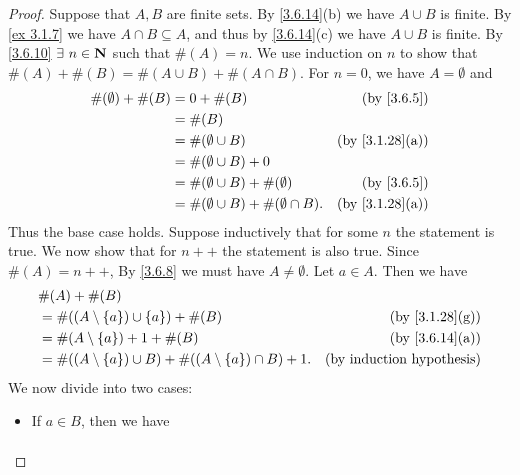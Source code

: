\begin{proof}
  Suppose that \(A, B\) are finite sets.
  By \cref{3.6.14}(b) we have \(A \cup B\) is finite.
  By \cref{ex 3.1.7} we have \(A \cap B \subseteq A\), and thus by \cref{3.6.14}(c) we have \(A \cup B\) is finite.
  By \cref{3.6.10} \(\exists\ n \in \N\) such that \(\#(A) = n\).
  We use induction on \(n\) to show that \(\#(A) + \#(B) = \#(A \cup B) + \#(A \cap B)\).
  For \(n = 0\), we have \(A = \emptyset\) and
  \begin{align*}
    \#(\emptyset) + \#(B) & = 0 + \#(B)                                    & \text{(by \cref{3.6.5})}     \\
                          & = \#(B)                                                                       \\
                          & = \#(\emptyset \cup B)                         & \text{(by \cref{3.1.28}(a))} \\
                          & = \#(\emptyset \cup B) + 0                                                    \\
                          & = \#(\emptyset \cup B) + \#(\emptyset)         & \text{(by \cref{3.6.5})}     \\
                          & = \#(\emptyset \cup B) + \#(\emptyset \cap B). & \text{(by \cref{3.1.28}(a))}
  \end{align*}
  Thus the base case holds.
  Suppose inductively that for some \(n\) the statement is true.
  We now show that for \(n++\) the statement is also true.
  Since \(\#(A) = n++\), By \cref{3.6.8} we must have \(A \neq \emptyset\).
  Let \(a \in A\).
  Then we have
  \begin{align*}
     & \#(A) + \#(B)                                                                                             \\
     & = \#((A \setminus \{a\}) \cup \{a\}) + \#(B)                           & \text{(by \cref{3.1.28}(g))}     \\
     & = \#(A \setminus \{a\}) + 1 + \#(B)                                    & \text{(by \cref{3.6.14}(a))}     \\
     & = \#((A \setminus \{a\}) \cup B) + \#((A \setminus \{a\}) \cap B) + 1. & \text{(by induction hypothesis)}
  \end{align*}
  We now divide into two cases:
  \begin{itemize}
    \item If \(a \in B\), then we have
          \begin{align*}

\end{align*}
\end{itemize}
\end{proof}
